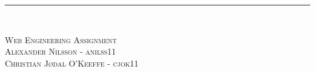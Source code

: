 \thispagestyle{empty}
\begin{flushright}
\vspace{3cm}

\phantom{hul}

\phantom{hul}

\phantom{hul}

\rule{0.8\textwidth}{3mm} \\ \vspace{1.5cm}


\vspace{1.5cm} 
\textsc{\Large Web Engineering Assignment\\
Alexander Nilsson - anilss11\\
Christian Jødal O'Keeffe - cjok11\\
~\\
}
\end{flushright}
